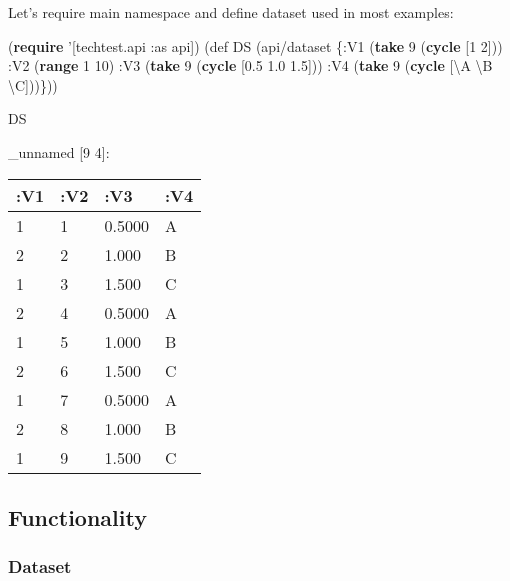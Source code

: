 \documentclass[]{article}
\newenvironment{Shaded}{\begin{snugshade}}{\end{snugshade}}
\newcommand{\KeywordTok}[1]{\textcolor[rgb]{0.13,0.29,0.53}{\textbf{#1}}}
\newcommand{\DecValTok}[1]{\textcolor[rgb]{0.00,0.00,0.81}{#1}}
\newcommand{\FloatTok}[1]{\textcolor[rgb]{0.00,0.00,0.81}{#1}}
\newcommand{\CharTok}[1]{\textcolor[rgb]{0.31,0.60,0.02}{#1}}
\newcommand{\FunctionTok}[1]{\textcolor[rgb]{0.00,0.00,0.00}{#1}}
\newcommand{\BuiltInTok}[1]{#1}
\newcommand{\AttributeTok}[1]{\textcolor[rgb]{0.77,0.63,0.00}{#1}}
\newcommand{\NormalTok}[1]{#1}
\begin{document}
Let's require main namespace and define dataset used in most examples:

\begin{Shaded}
\begin{Highlighting}[]
\NormalTok{(}\KeywordTok{require}\NormalTok{ '[techtest.api }\AttributeTok{:as}\NormalTok{ api])}
\NormalTok{(}\BuiltInTok{def}\FunctionTok{ DS }\NormalTok{(api/dataset \{}\AttributeTok{:V1}\NormalTok{ (}\KeywordTok{take} \DecValTok{9}\NormalTok{ (}\KeywordTok{cycle}\NormalTok{ [}\DecValTok{1} \DecValTok{2}\NormalTok{]))}
                      \AttributeTok{:V2}\NormalTok{ (}\KeywordTok{range} \DecValTok{1} \DecValTok{10}\NormalTok{)}
                      \AttributeTok{:V3}\NormalTok{ (}\KeywordTok{take} \DecValTok{9}\NormalTok{ (}\KeywordTok{cycle}\NormalTok{ [}\FloatTok{0.5} \FloatTok{1.0} \FloatTok{1.5}\NormalTok{]))}
                      \AttributeTok{:V4}\NormalTok{ (}\KeywordTok{take} \DecValTok{9}\NormalTok{ (}\KeywordTok{cycle}\NormalTok{ [}\CharTok{\textbackslash{}A} \CharTok{\textbackslash{}B} \CharTok{\textbackslash{}C}\NormalTok{]))\}))}
\end{Highlighting}
\end{Shaded}

\begin{Shaded}
\begin{Highlighting}[]
\NormalTok{DS}
\end{Highlighting}
\end{Shaded}

\_unnamed {[}9 4{]}:

\begin{longtable}[]{@{}llll@{}}
\toprule
:V1 & :V2 & :V3 & :V4\tabularnewline
\midrule
\endhead
1 & 1 & 0.5000 & A\tabularnewline
2 & 2 & 1.000 & B\tabularnewline
1 & 3 & 1.500 & C\tabularnewline
2 & 4 & 0.5000 & A\tabularnewline
1 & 5 & 1.000 & B\tabularnewline
2 & 6 & 1.500 & C\tabularnewline
1 & 7 & 0.5000 & A\tabularnewline
2 & 8 & 1.000 & B\tabularnewline
1 & 9 & 1.500 & C\tabularnewline
\bottomrule
\end{longtable}

\subsection{Functionality}\label{functionality}

\subsubsection{Dataset}\label{dataset}
\end{document}
